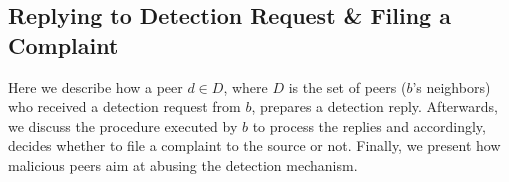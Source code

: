 % 
% 

\subsection{Replying to Detection Request \& Filing a Complaint}
\label{Filing_a_Complain}
Here we describe how a peer $d \in D$, where $D$ is the set of peers ($b$'s neighbors) who received a detection request from $b$, prepares a detection reply.
Afterwards, we discuss the procedure executed by $b$ to process the replies and accordingly, decides whether to file a complaint to the source or not.
Finally, we present how malicious peers aim at abusing the detection mechanism.


